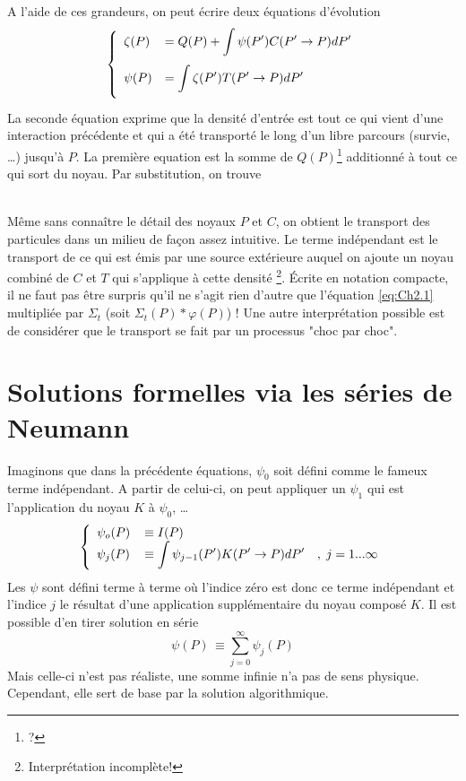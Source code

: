 A l'aide de ces grandeurs, on peut écrire deux équations d'évolution
\begin{equation}
\left\{\begin{array}{ll}
\zeta (P) &\DS= Q(P) + \int\limits_{}   \psi (P')C(P' \to P)dP'\\
\psi (P) &\DS= \int\limits_{}   \zeta (P')T(P' \to P)dP'
\end{array}\right.
\end{equation}
La seconde équation exprime que la densité d'entrée est tout ce qui vient d'une interaction 
précédente et qui a été transporté le long d'un libre parcours (survie, \dots) jusqu'à $P$. La 
première equation est la somme de $Q(P)$\footnote{?} additionné à tout ce qui sort du noyau. Par 
substitution, on trouve\\

\ 

Même sans connaître le détail des noyaux $P$ et $C$, on obtient le transport des particules dans un 
milieu de façon assez intuitive. Le terme indépendant est le transport de ce qui est émis par une 
source extérieure auquel on ajoute un noyau combiné de $C$ et $T$ qui s'applique à cette densité
\footnote{Interprétation incomplète!}. Écrite en notation compacte, il ne faut pas être surpris 
qu'il ne s'agit rien d'autre que l'équation \eqref{eq:Ch2.1} multipliée par $\Sigma_t$ (soit 
$\Sigma_t(P)*\varphi(P)$) ! Une autre interprétation possible est de considérer que le transport 
se fait par un processus "choc par choc".


\section{Solutions formelles via les séries de Neumann}
Imaginons que dans la précédente équations, $\psi_0$ soit défini comme le fameux terme indépendant. 
A partir de celui-ci, on peut appliquer un $\psi_1$ qui est l'application du noyau $K$ à $\psi_0$, 
\dots 
\begin{equation}
\left\{\begin{array}{ll}
{\psi _o}(P) &\equiv I(P)\\
{\psi _j}(P)\, &\DS\equiv \int   {\psi _{j - 1}}(P')K(P' \to P)dP'\quad ,\;j = 1...\infty 
\end{array}\right.
\end{equation}
Les $\psi$ sont défini terme à terme où l'indice zéro est donc ce terme indépendant et l'indice 
$j$ le résultat d'une application supplémentaire du noyau composé $K$. Il est possible d'en tirer 
solution en série
\begin{equation}
\psi (P)\, \equiv \sum\limits_{j = 0}^\infty    {\psi _j}(P)
\end{equation}
Mais celle-ci n'est pas réaliste, une somme infinie n'a pas de sens physique. Cependant, elle sert 
de base par la solution algorithmique.